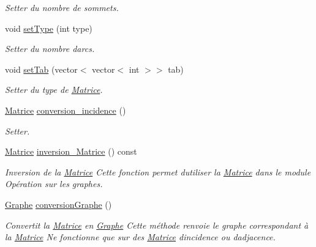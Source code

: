 \begin{DoxyCompactItemize}
\begin{DoxyCompactList}\small\item\em Setter du nombre de sommets. \end{DoxyCompactList}\item 
\mbox{\label{classMatrice_a7a1255693086a05c96b926e0bcdb7082}} 
void \hyperlink{classMatrice_a7a1255693086a05c96b926e0bcdb7082}{set\+Type} (int type)
\begin{DoxyCompactList}\small\item\em Setter du nombre d\textquotesingle{}arcs. \end{DoxyCompactList}\item 
\mbox{\label{classMatrice_a365b41a95907ad5d62a83ea101a53dce}} 
void \hyperlink{classMatrice_a365b41a95907ad5d62a83ea101a53dce}{set\+Tab} (vector$<$ vector$<$ int $>$$>$ tab)
\begin{DoxyCompactList}\small\item\em Setter du type de \hyperlink{classMatrice}{Matrice}. \end{DoxyCompactList}\item 
\hyperlink{classMatrice}{Matrice} \hyperlink{classMatrice_aee2d46b335d4b3346a5dc265c7cd2759}{conversion\+\_\+incidence} ()
\begin{DoxyCompactList}\small\item\em Setter. \end{DoxyCompactList}\item 
\hyperlink{classMatrice}{Matrice} \hyperlink{classMatrice_a5f25a7bf06c46b69c24e82d3af3c697f}{inversion\+\_\+\+Matrice} () const
\begin{DoxyCompactList}\small\item\em Inversion de la \hyperlink{classMatrice}{Matrice} Cette fonction permet d\textquotesingle{}utiliser la \hyperlink{classMatrice}{Matrice} dans le module Op\'{e}ration sur les graphes. \end{DoxyCompactList}\item 
\hyperlink{classGraphe}{Graphe} \hyperlink{classMatrice_a3b6cb901a40c673c9f78c11bfd12892d}{conversion\+Graphe} ()
\begin{DoxyCompactList}\small\item\em Convertit la \hyperlink{classMatrice}{Matrice} en \hyperlink{classGraphe}{Graphe} Cette m\'{e}thode renvoie le graphe correspondant \`{a} la \hyperlink{classMatrice}{Matrice} Ne fonctionne que sur des \hyperlink{classMatrice}{Matrice} d\textquotesingle{}incidence ou d\textquotesingle{}adjacence. \end{DoxyCompactList}\item 
$$
\end{DoxyCompactItemize}
